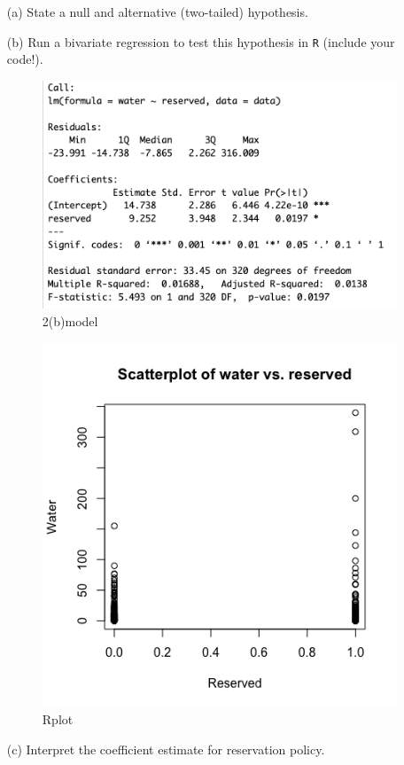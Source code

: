 \documentclass[12pt,letterpaper]{article}
\begin{document}
	\newpage
	\begin{enumerate}
		\item [(a)] State a null and alternative (two-tailed) hypothesis. 
		
		\vspace{6cm}
		
		
		\item [(b)] Run a bivariate regression to test this hypothesis in \texttt{R} (include your code!).
		
		\begin{figure}
			\centering
			\includegraphics[width=0.5\linewidth]{2(b)model.png}
			\caption{2(b)model}
			\label{fig:enter-label}
		\end{figure}
		\begin{figure}
			\centering
			\includegraphics[width=0.5\linewidth]{Rplot.png}
			\caption{Rplot}
			\label{fig:enter-label}
		\end{figure}
		\vspace{100cm}
		\item [(c)] Interpret the coefficient estimate for reservation policy.
		
	\end{enumerate}
	
\end{document}
